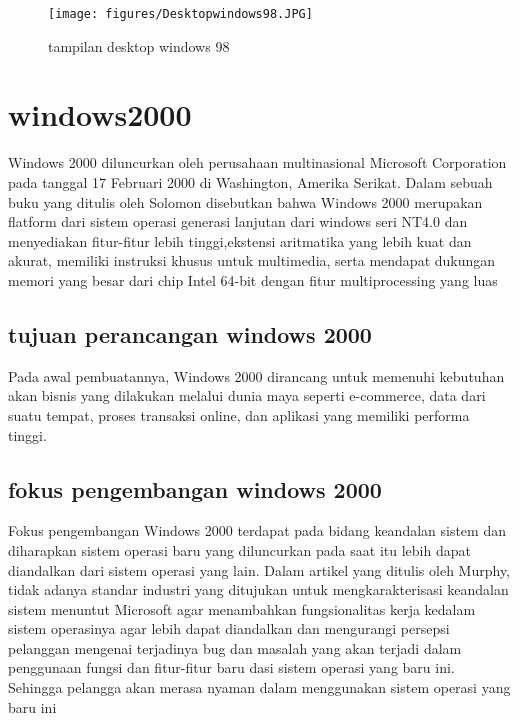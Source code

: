 \begin{enumerate}
		\begin{figure}[ht]
		\centerline{\texttt{[image: figures/Desktopwindows98.JPG]}}
		\caption{tampilan desktop windows 98}
		\label{Desktopwindows98}
		\end{figure}

\section{windows2000}
	Windows 2000 diluncurkan oleh perusahaan multinasional Microsoft Corporation pada tanggal 17 Februari 2000 di Washington, Amerika Serikat. 
	Dalam sebuah buku yang ditulis oleh Solomon disebutkan bahwa Windows 2000 merupakan flatform dari sistem operasi generasi lanjutan dari windows seri NT4.0 dan menyediakan fitur-fitur lebih tinggi,ekstensi aritmatika yang lebih kuat dan akurat, memiliki instruksi khusus untuk multimedia, serta mendapat dukungan memori yang besar dari chip Intel 64-bit dengan fitur multiprocessing yang luas \cite{solomon2000inside}
	\subsection{tujuan perancangan windows 2000}
		Pada awal pembuatannya, Windows 2000 dirancang untuk memenuhi kebutuhan akan bisnis yang dilakukan melalui dunia maya seperti e-commerce, data dari suatu tempat, proses transaksi online, dan aplikasi yang memiliki performa tinggi.
	\subsection{fokus pengembangan windows 2000}
		Fokus pengembangan Windows 2000 terdapat pada bidang keandalan sistem dan diharapkan sistem operasi baru yang diluncurkan pada saat itu lebih dapat diandalkan dari sistem operasi yang lain.
		Dalam artikel yang ditulis oleh Murphy, tidak adanya standar industri yang ditujukan untuk mengkarakterisasi keandalan sistem menuntut Microsoft agar menambahkan fungsionalitas kerja kedalam sistem operasinya agar lebih dapat diandalkan dan mengurangi persepsi pelanggan mengenai terjadinya bug dan masalah yang akan terjadi dalam penggunaan fungsi dan fitur-fitur baru dasi sistem operasi yang baru ini. Sehingga pelangga akan merasa nyaman dalam menggunakan sistem operasi yang baru ini \cite{murphy2000windows} 


\end{enumerate}
